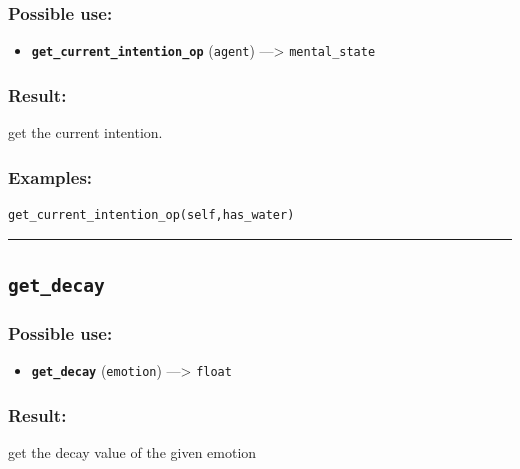 \documentclass[]{book}
\providecommand{\tightlist}{%
  \setlength{\itemsep}{0pt}\setlength{\parskip}{0pt}}
\theoremstyle{definition}
\theoremstyle{definition}
\theoremstyle{definition}
\theoremstyle{remark}
\begin{document}
\subsubsection{Possible use:}\label{possible-use-201}

\begin{itemize}
\tightlist
\item
  \textbf{\texttt{get\_current\_intention\_op}} (\texttt{agent})
  ---\textgreater{} \texttt{mental\_state}
\end{itemize}

\subsubsection{Result:}\label{result-195}

get the current intention.

\subsubsection{Examples:}\label{examples-148}

\begin{verbatim}
get_current_intention_op(self,has_water) 
\end{verbatim}

\begin{center}\rule{0.5\linewidth}{\linethickness}\end{center}

\subsection{\texorpdfstring{\texttt{get\_decay}}{get\_decay}}\label{get_decay}

\subsubsection{Possible use:}\label{possible-use-202}

\begin{itemize}
\tightlist
\item
  \textbf{\texttt{get\_decay}} (\texttt{emotion}) ---\textgreater{}
  \texttt{float}
\end{itemize}

\subsubsection{Result:}\label{result-196}

get the decay value of the given emotion
\end{document}
